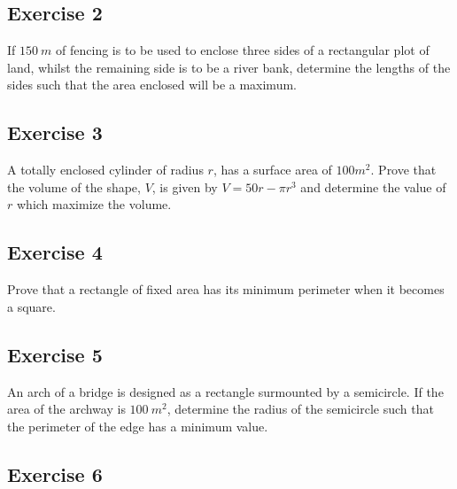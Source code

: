\documentclass[
  english,
  11pt,
  oneside]{book}
\newcommand{\slide}{}
\theoremstyle{definition}
\theoremstyle{definition}
\theoremstyle{definition}
\theoremstyle{definition}
\theoremstyle{remark}
\begin{document}
\slide

\subsection*{Exercise 2}\label{exercise-2-4}

If \(150\ m\) of fencing is to be used to enclose three sides of a rectangular plot of land, whilst the remaining side is to be a river bank, determine the lengths of the sides such that the area enclosed will be a maximum.

\slide

\subsection*{Exercise 3}\label{exercise-3-3}

A totally enclosed cylinder of radius \(r\), has a surface area of \(100 m^2\). Prove that the volume of the shape, \(V\), is given by \(V = 50r - \pi r^3\) and determine the value of \(r\) which maximize the volume.

\slide

\subsection*{Exercise 4}\label{exercise-4-3}

Prove that a rectangle of fixed area has its minimum perimeter when it becomes a square.

\slide

\subsection*{Exercise 5}\label{exercise-5-2}

An arch of a bridge is designed as a rectangle surmounted by a semicircle. If the area of the archway is \(100\ m^2\), determine the radius of the semicircle such that the perimeter of the edge has a minimum value.

\slide

\subsection*{Exercise 6}\label{exercise-6-2}
\end{document}
